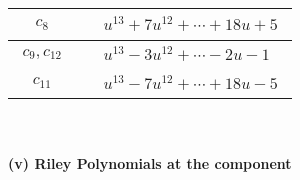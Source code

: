 \documentclass[1p]{elsarticle_modified}
\theoremstyle{definition}
\begin{document}
\begin{tabular}{m{50pt}|m{274pt}}
\hline $$\begin{aligned}c_{8}\end{aligned}$$&$\begin{aligned}
&u^{13}+7 u^{12}+\cdots+18 u+5
\end{aligned}$\\
\hline $$\begin{aligned}c_{9},c_{12}\end{aligned}$$&$\begin{aligned}
&u^{13}-3 u^{12}+\cdots-2 u-1
\end{aligned}$\\
\hline $$\begin{aligned}c_{11}\end{aligned}$$&$\begin{aligned}
&u^{13}-7 u^{12}+\cdots+18 u-5
\end{aligned}$\\
\hline
\end{tabular}\\~\\
\newpage\renewcommand{\arraystretch}{1}
\flushleft \textbf{(v) Riley Polynomials at the component}\newline \\
\end{document}
